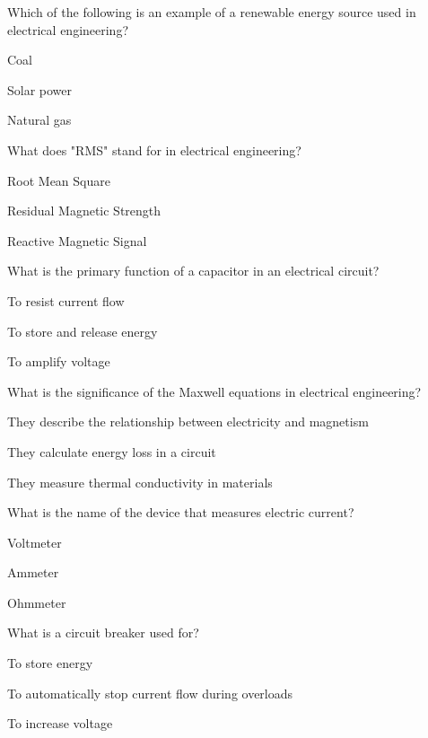 \begin{enhancedmcq}{Which of the following is an example of a renewable energy source used in electrical engineering?}
\item Coal
\item Solar power
\item Natural gas

\end{enhancedmcq}
\begin{enhancedmcq}{What does "RMS" stand for in electrical engineering?}
\item Root Mean Square
\item Residual Magnetic Strength
\item Reactive Magnetic Signal

\end{enhancedmcq}
\begin{enhancedmcq}{What is the primary function of a capacitor in an electrical circuit?}
\item To resist current flow
\item To store and release energy
\item To amplify voltage

\end{enhancedmcq}
\begin{enhancedmcq}{What is the significance of the Maxwell equations in electrical engineering?}
\item They describe the relationship between electricity and magnetism
\item They calculate energy loss in a circuit
\item They measure thermal conductivity in materials

\end{enhancedmcq}
\begin{enhancedmcq}{What is the name of the device that measures electric current?}
\item Voltmeter
\item Ammeter
\item Ohmmeter

\end{enhancedmcq}
\begin{enhancedmcq}{What is a circuit breaker used for?}
\item To store energy
\item To automatically stop current flow during overloads
\item To increase voltage

\end{enhancedmcq}
